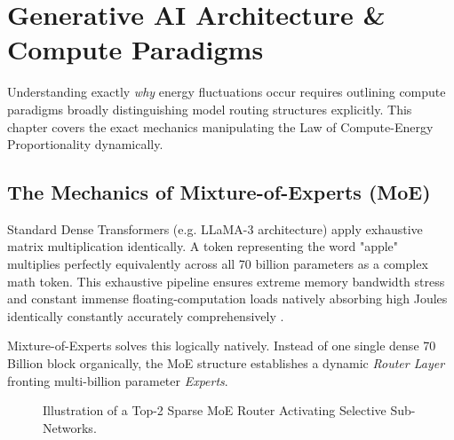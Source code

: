 \documentclass[12pt, a4paper]{report}
\begin{document}
\chapter{Generative AI Architecture \& Compute Paradigms}
\label{ch:architecture}

Understanding exactly \textit{why} energy fluctuations occur requires outlining compute paradigms broadly distinguishing model routing structures explicitly. This chapter covers the exact mechanics manipulating the Law of Compute-Energy Proportionality dynamically. 

\section{The Mechanics of Mixture-of-Experts (MoE)}
Standard Dense Transformers (e.g. LLaMA-3 architecture) apply exhaustive matrix multiplication identically. A token representing the word "apple" multiplies perfectly equivalently across all 70 billion parameters as a complex math token. This exhaustive pipeline ensures extreme memory bandwidth stress and constant immense floating-computation loads natively absorbing high Joules identically constantly accurately comprehensively \cite{shazeer2017moe}.

Mixture-of-Experts solves this logically natively. Instead of one single dense 70 Billion block organically, the MoE structure establishes a dynamic \textit{Router Layer} fronting multi-billion parameter \textit{Experts}. 

\begin{figure}[htbp]
  \centering
  \caption{Illustration of a Top-2 Sparse MoE Router Activating Selective Sub-Networks.}
  \label{fig:moe_detailed}
\end{figure}
\end{document}
